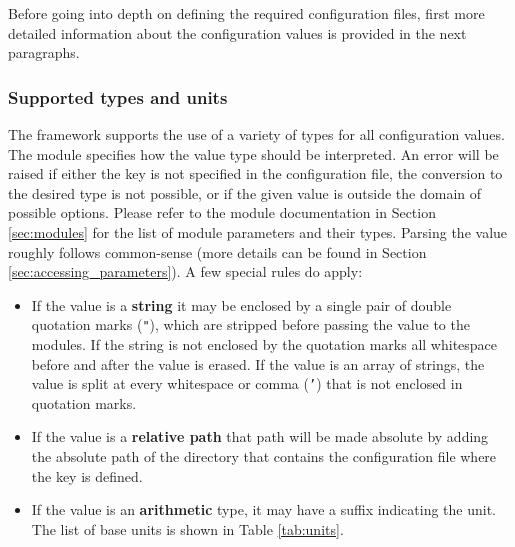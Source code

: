 Before going into depth on defining the required configuration files, first more detailed information about the configuration values is provided in the next paragraphs.

\subsubsection{Supported types and units}
\label{sec:config_values}
The \apsq framework supports the use of a variety of types for all configuration values. The module specifies how the value type should be interpreted. An error will be raised if either the key is not specified in the configuration file, the conversion to the desired type is not possible, or if the given value is outside the domain of possible options. Please refer to the module documentation in Section \ref{sec:modules} for the list of module parameters and their types. Parsing the value roughly follows common-sense (more details can be found in Section \ref{sec:accessing_parameters}). A few special rules do apply:
\begin{itemize}
\item If the value is a \textbf{string} it may be enclosed by a single pair of double quotation marks (\texttt{"}), which are stripped before passing the value to the modules. If the string is not enclosed by the quotation marks all whitespace before and after the value is erased. If the value is an array of strings, the value is split at every whitespace or comma (\texttt{'}) that is not enclosed in quotation marks.
\item If the value is a \textbf{relative path} that path will be made absolute by adding the absolute path of the directory that contains the configuration file where the key is defined.
\item If the value is an \textbf{arithmetic} type, it may have a suffix indicating the unit. The list of base units is shown in Table \ref{tab:units}. 
\end{itemize}

